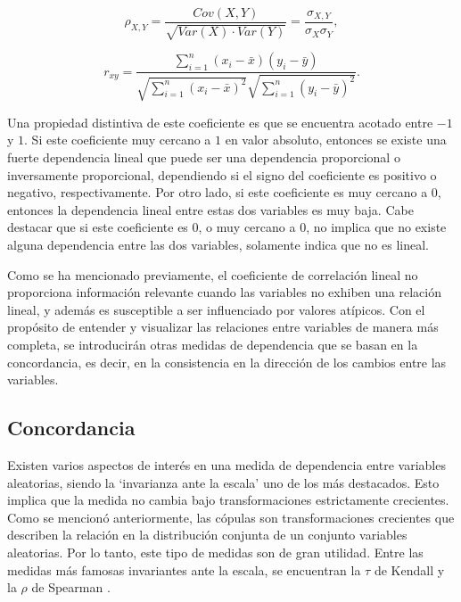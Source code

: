 \begin{equation}\label{correlacion}
    \rho_{X, Y} = \frac{Cov(X, Y)}{\sqrt{Var(X) \cdot Var(Y)}} = \frac{\sigma_{X, Y}}{\sigma_X \sigma_Y},
\end{equation}

\begin{equation}\label{corrMuestral}
    r_{x y}=\frac{\sum_{i=1}^n\left(x_i-\bar{x}\right)\left(y_i-\bar{y}\right)}{\sqrt{\sum_{i=1}^n\left(x_i-\bar{x}\right)^2} \sqrt{\sum_{i=1}^n\left(y_i-\bar{y}\right)^2}}.
\end{equation}

 Una propiedad distintiva de este coeficiente es que se encuentra acotado entre $-1$ y $1$. Si este coeficiente muy cercano a $1$ en valor absoluto, entonces se existe una fuerte dependencia lineal que puede ser una dependencia proporcional o inversamente proporcional, dependiendo si el signo del coeficiente es positivo o negativo, respectivamente. Por otro lado, si este coeficiente es muy cercano a 0, entonces la dependencia lineal entre estas dos variables es muy baja. Cabe destacar que si este coeficiente es $0$, o muy cercano a $0$, no implica que no existe alguna dependencia entre las dos variables, solamente indica que no es lineal.

Como se ha mencionado previamente, el coeficiente de correlación lineal no proporciona información relevante cuando las variables no exhiben una relación lineal, y además es susceptible a ser influenciado por valores atípicos. Con el propósito de entender y visualizar las relaciones entre variables de manera más completa, se introducirán otras medidas de dependencia que se basan en la concordancia, es decir, en la consistencia en la dirección de los cambios entre las variables.




\subsection{Concordancia}

Existen varios aspectos de interés en una medida de dependencia entre variables aleatorias, siendo la `invarianza ante la escala' uno de los más destacados. Esto implica que la medida no cambia bajo transformaciones estrictamente crecientes. Como se mencionó anteriormente, las cópulas son transformaciones crecientes que describen la relación en la distribución conjunta de un conjunto variables aleatorias. Por lo tanto, este tipo de medidas son de gran utilidad. Entre las medidas más famosas invariantes ante la escala, se encuentran la $\tau$ de Kendall y la $\rho$ de Spearman \cite{czadoAnalyzing}.

